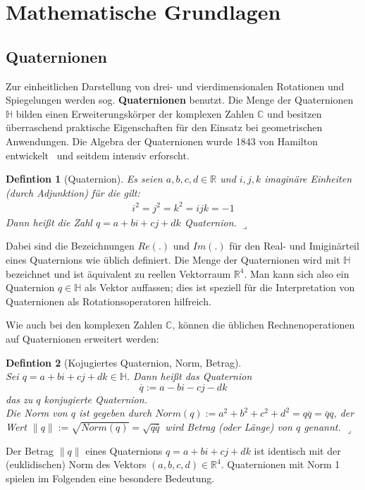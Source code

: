 \newtheorem{defdef}{Defintion}[section]
\newenvironment{definition}[1][]{\begin{defdef}[#1] \normalfont\hspace*{1mm}}{\hfill $\lrcorner$\end{defdef}\vspace{0.2cm}}

\section{Mathematische Grundlagen}
\subsection{Quaternionen}\label{quaternionen}
Zur einheitlichen Darstellung von drei- und vierdimensionalen Rotationen und Spiegelungen werden
sog. \textbf{Quaternionen} benutzt.
Die Menge der Quaternionen $\mathbb{H}$ bilden einen Erweiterungskörper der komplexen Zahlen $\mathbb{C}$ und besitzen überraschend praktische Eigenschaften für den Einsatz bei geometrischen Anwendungen. Die Algebra der Quaternionen wurde 1843 von Hamilton entwickelt~\cite{hazewinkel2004algebras} und seitdem intensiv erforscht.

\begin{definition}[Quaternion]
Es seien $a,b,c,d \in \mathbb{R}$ und $i,j,k$ imaginäre Einheiten (durch Adjunktion) für die gilt:
\begin{equation*}\begin{split}
i^2 = j^2 = k^2 = ijk = -1
\end{split}\end{equation*}
Dann heißt die Zahl $q = a + bi + cj + dk$ Quaternion.
\end{definition}
Dabei sind die Bezeichnungen $Re(.)$ und $Im(.)$ für den Real- und Imiginärteil eines Quaternions wie üblich definiert.
Die Menge der Quaternionen wird mit $\mathbb{H}$ bezeichnet und ist äquivalent zu reellen Vektorraum $\mathbb{R}^4$.
Man kann sich also ein Quaternion $q \in \mathbb{H}$ als Vektor auffassen; dies ist speziell für die Interpretation
von Quaternionen als Rotationsoperatoren hilfreich.

Wie auch bei den komplexen Zahlen $\mathbb{C}$, können die üblichen Rechnenoperationen auf Quaternionen erweitert werden:

\begin{definition}[Kojugiertes Quaternion, Norm, Betrag] $\quad$ \\
Sei $q = a + bi + cj + dk \in \mathbb{H}$. Dann heißt das Quaternion
\begin{equation*}
\overline{q} := a - bi - cj - dk
\end{equation*} das zu $q$ konjugierte Quaternion. \\
Die Norm von $q$ ist gegeben durch $Norm(q) := a^2 + b^2 + c^2 + d^2 = q\overline{q} = \overline{q}q$, der Wert
$\| q \| := \sqrt{Norm(q)} = \sqrt{q \overline{q}}$ wird Betrag (oder Länge) von $q$ genannt.
\end{definition}
\noindent Der Betrag $\|q\|$ eines Quaternions $q = a + bi + cj + dk$ ist identisch mit der (euklidischen) Norm des Vektors $(a,b,c,d) \in \mathbb{R}^4$. Quaternionen mit Norm 1 spielen im Folgenden eine besondere Bedeutung.

